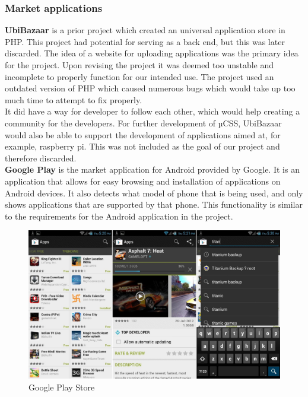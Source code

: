 \subsubsection{Market applications}

{\bf UbiBazaar} is a prior project which created an universal application store in PHP. This project had potential for serving as a back end, but this was later discarded. The idea of a website for uploading applications was the primary idea for the project. Upon revising the project it was deemed too unstable and incomplete to properly function for our intended use. The project used an outdated version of PHP which caused numerous bugs which would take up too much time to attempt to fix properly.\\

It did have a way for developer to follow each other, which would help creating a community for the developers. For further development of µCSS, UbiBazaar would also be able to support the development of applications aimed at, for example, raspberry pi. This was not included as the goal of our project and therefore discarded.\\

{\bf Google Play} is the market application for Android provided by Google. It is an application that allows for easy browsing and installation of applications on Android devices. It also detects what model of phone that is being used, and only shows applications that are supported by that phone. This functionality is similar to the requirements for the Android application in the project.
\\

\begin{figure}[H]
\includegraphics[scale=0.2]{images/Google-Play-Store-APK-3-7-15.jpg}
\caption{Google Play Store}
\end{figure}

